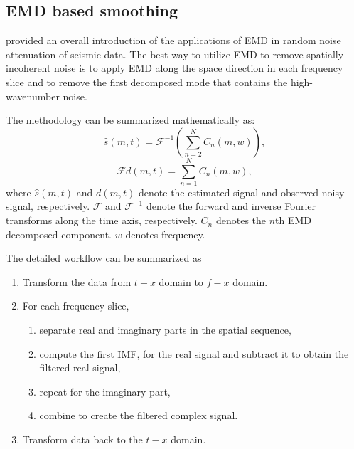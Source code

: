 \subsection{EMD based smoothing}
\cite{yangkang2014emdsum} provided an overall introduction of the applications of EMD in random noise attenuation of seismic data. The best way to utilize EMD to remove spatially incoherent noise is to apply EMD along the space direction in each frequency slice and to remove the first decomposed mode that contains the high-wavenumber noise. 

The methodology can be summarized mathematically as:
\begin{equation}
\label{eq:fxemd}
\hat{s}(m,t) = \mathcal{F}^{-1}\left(\sum_{n=2}^{N}C_n(m,w)\right), 
\end{equation}
\begin{equation}
\label{eq:fxemd2}
\mathcal{F} d(m,t)  = \sum_{n=1}^{N} C_n(m,w),
\end{equation}
where $\hat{s}(m,t)$ and $d(m,t)$ denote the estimated signal and observed noisy signal, respectively. $\mathcal{F}$ and $\mathcal{F}^{-1}$ denote the forward and inverse Fourier transforms along the time axis, respectively. $C_n$ denotes the $n$th EMD decomposed component. $w$ denotes frequency. 

The detailed workflow can be summarized as 
\begin{enumerate}
\item 
Transform the data from $t-x$ domain to $f-x$ domain.
\item 
For each frequency slice, 
\begin{enumerate}
\item
separate real and imaginary parts in the spatial sequence,
\item
compute the first IMF, for the real signal and subtract it to obtain the filtered real signal,
\item
repeat for the imaginary part,
\item
combine to create the filtered complex signal.
\end{enumerate}
\item
Transform data back to the $t-x$ domain.
\end{enumerate}

